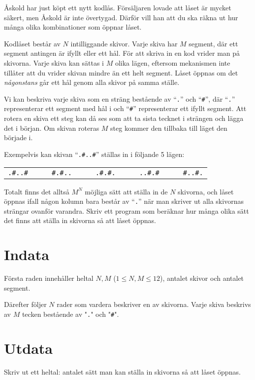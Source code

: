 Åskold har just köpt ett nytt kodlås.
Försäljaren lovade att låset är mycket säkert, men Åskold är inte övertygad.
Därför vill han att du ska räkna ut hur många olika kombinationer som öppnar låset.

Kodlåset består av $N$ intilliggande skivor.
Varje skiva har $M$ segment, där ett segment antingen är ifyllt eller ett hål.
För att skriva in en kod vrider man på skivorna.
Varje skiva kan sättas i $M$ olika lägen, eftersom mekanismen inte tillåter att du vrider skivan mindre än ett helt segment.
Låset öppnas om det \emph{någonstans} går ett hål genom alla skivor på samma ställe.

Vi kan beskriva varje skiva som en sträng bestående av ``\texttt{.}'' och ``\texttt{\#}'',
där ``\texttt{.}'' representerar ett segment med hål i och ``\texttt{\#}'' representerar ett ifyllt segment.
Att rotera en skiva ett steg kan då ses som att ta sista tecknet i strängen och lägga det i början.
Om skivan roteras $M$ steg kommer den tillbaka till läget den började i.

Exempelvis kan skivan ``\texttt{.\#..\#}'' ställas in i följande 5 lägen:

\begin{center}
  \begin{tabular}{l|l|l|l|l}
    \texttt{.\#..\#}&&&\texttt{\#.\#..}&&&\texttt{.\#.\#.}&&&\texttt{..\#.\#}&&&\texttt{\#..\#.}
  \end{tabular}
\end{center}

Totalt finns det alltså $M^N$ möjliga sätt att ställa in de $N$ skivorna, och låset öppnas ifall någon kolumn bara består av ``\texttt{.}'' 
när man skriver ut alla skivornas strängar ovanför varandra. Skriv ett program som beräknar hur många olika sätt det finns att ställa in skivorna så att låset öppnas.

\section*{Indata}
Första raden innehåller heltal $N, M$ ($1\le N, M \le 12$), antalet skivor och antalet segment.

Därefter följer $N$ rader som vardera beskriver en av skivorna.
Varje skiva beskrivs av $M$ tecken bestående av "\texttt{.}" och "\texttt{\#}".

\section*{Utdata}
Skriv ut ett heltal: antalet sätt man kan ställa in skivorna så att låset öppnas.

